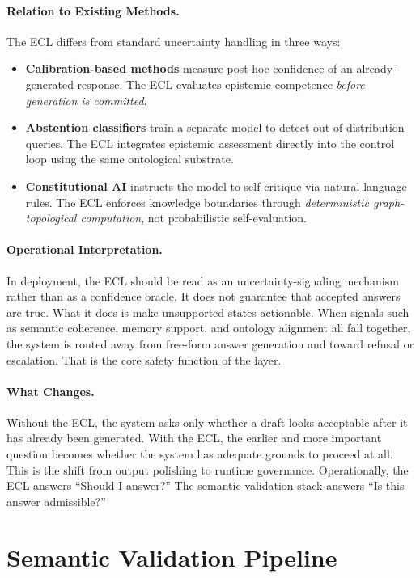 \documentclass[11pt,a4paper]{article}
\begin{document}
\paragraph{Relation to Existing Methods.}
The ECL differs from standard uncertainty handling in three ways:
\begin{itemize}
  \item \textbf{Calibration-based methods} \cite{kadavath2022} measure post-hoc confidence of an already-generated response. The ECL evaluates epistemic competence \textit{before generation is committed}.
  \item \textbf{Abstention classifiers} train a separate model to detect out-of-distribution queries. The ECL integrates epistemic assessment directly into the control loop using the same ontological substrate.
  \item \textbf{Constitutional AI} \cite{bai2022} instructs the model to self-critique via natural language rules. The ECL enforces knowledge boundaries through \textit{deterministic graph-topological computation}, not probabilistic self-evaluation.
\end{itemize}

\paragraph{Operational Interpretation.}
In deployment, the ECL should be read as an uncertainty-signaling mechanism rather than as a confidence oracle. It does not guarantee that accepted answers are true. What it does is make unsupported states actionable. When signals such as semantic coherence, memory support, and ontology alignment all fall together, the system is routed away from free-form answer generation and toward refusal or escalation. That is the core safety function of the layer.

\paragraph{What Changes.}
Without the ECL, the system asks only whether a draft looks acceptable after it has already been generated. With the ECL, the earlier and more important question becomes whether the system has adequate grounds to proceed at all. This is the shift from output polishing to runtime governance.
Operationally, the ECL answers ``Should I answer?'' The semantic validation stack answers ``Is this answer admissible?''

\section{Semantic Validation Pipeline}
\end{document}
